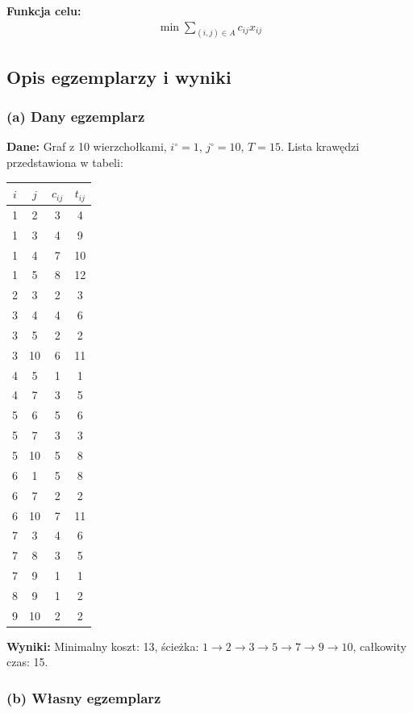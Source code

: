 \documentclass[a4paper,12pt]{article}
\begin{document}
\textbf{Funkcja celu:}
\begin{align*}
\min \sum_{(i,j)\in A} c_{ij} x_{ij}
\end{align*}

\subsection*{Opis egzemplarzy i wyniki}

\subsubsection*{(a) Dany egzemplarz}

\textbf{Dane:} Graf z 10 wierzchołkami, $i^\circ = 1$, $j^\circ = 10$, $T = 15$. Lista krawędzi przedstawiona w tabeli:

\begin{center}
\begin{tabular}{cccc}
$i$ & $j$ & $c_{ij}$ & $t_{ij}$ \\
\hline
1 & 2 & 3 & 4 \\
1 & 3 & 4 & 9 \\
1 & 4 & 7 & 10 \\
1 & 5 & 8 & 12 \\
2 & 3 & 2 & 3 \\
3 & 4 & 4 & 6 \\
3 & 5 & 2 & 2 \\
3 & 10 & 6 & 11 \\
4 & 5 & 1 & 1 \\
4 & 7 & 3 & 5 \\
5 & 6 & 5 & 6 \\
5 & 7 & 3 & 3 \\
5 & 10 & 5 & 8 \\
6 & 1 & 5 & 8 \\
6 & 7 & 2 & 2 \\
6 & 10 & 7 & 11 \\
7 & 3 & 4 & 6 \\
7 & 8 & 3 & 5 \\
7 & 9 & 1 & 1 \\
8 & 9 & 1 & 2 \\
9 & 10 & 2 & 2 \\
\end{tabular}
\end{center}

\textbf{Wyniki:} Minimalny koszt: 13, ścieżka: $1 \to 2 \to 3 \to 5 \to 7 \to 9 \to 10$, całkowity czas: 15.

\subsubsection*{(b) Własny egzemplarz}
\end{document}
